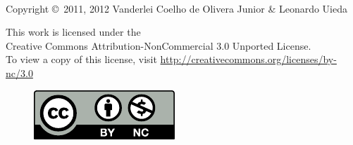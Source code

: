 \thispagestyle{empty}
\clearpage

\\[1cm]
\noindent Copyright \copyright\ 2011, 2012
Vanderlei Coelho de Olivera Junior \& Leonardo Uieda
\\[0.5cm]

\begin{center}
This work is licensed under the \\
Creative Commons Attribution-NonCommercial
3.0 Unported License.\\
To view a copy of this license, visit
\url{http://creativecommons.org/licenses/by-nc/3.0}
\end{center}

\begin{figure}[!h]
    \centering
    \includegraphics[scale=0.8]{figs/cc-by-nc}
\end{figure}
